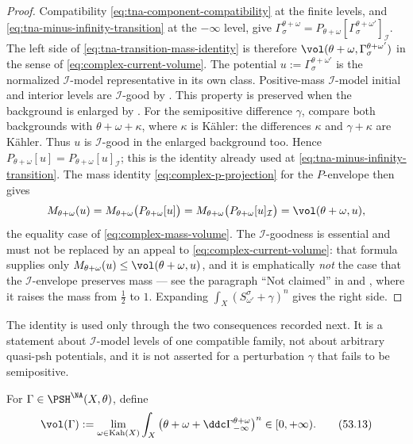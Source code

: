 \begin{proof}
Compatibility \eqref{eq:tna-component-compatibility} at the finite levels,
and \eqref{eq:tna-minus-infinity-transition} at the $-\infty$ level, give
$\Gamma_\sigma^{\theta+\omega}
   =P_{\theta+\omega}[\Gamma_\sigma^{\theta+\omega'}]_{\mathcal I}$.
The left side of \eqref{eq:tna-transition-mass-identity} is therefore
$\vol(\theta+\omega,\Gamma_\sigma^{\theta+\omega'})$ in the sense of
\eqref{eq:complex-current-volume}.  The potential $u:=\Gamma_\sigma^{\theta+\omega'}$ is the normalized
$\mathcal I$-model representative in its own class. Positive-mass
$\mathcal I$-model initial and interior levels are $\mathcal I$-good by
\cite[Example~7.1.2 and Theorem~7.1.1]{XiaBook}.
This property is preserved when the background is enlarged by
\cite[Lemma~7.1.1]{XiaBook}. For the semipositive difference $\gamma$,
compare both backgrounds with $\theta+\omega+\kappa$, where $\kappa$ is
K\"ahler: the differences $\kappa$ and $\gamma+\kappa$ are K\"ahler.
Thus $u$ is $\mathcal I$-good in the enlarged background too. Hence
$P_{\theta+\omega}[u]=P_{\theta+\omega}[u]_{\mathcal I}$; this is the
identity already used at \eqref{eq:tna-minus-infinity-transition}.  The mass
identity \eqref{eq:complex-p-projection} for the $P$-envelope then gives
\[
 M_{\theta+\omega}(u)
 =M_{\theta+\omega}\bigl(P_{\theta+\omega}[u]\bigr)
 =M_{\theta+\omega}\bigl(P_{\theta+\omega}[u]_{\mathcal I}\bigr)
 =\vol(\theta+\omega,u),
\]
the equality case of \eqref{eq:complex-mass-volume}.  The
$\mathcal I$-goodness is essential and must not be replaced by an appeal to
\eqref{eq:complex-current-volume}: that formula supplies only
$M_{\theta+\omega}(u)\leq\vol(\theta+\omega,u)$, and it is emphatically
\emph{not} the case that the $\mathcal I$-envelope preserves mass --- see
the paragraph ``Not claimed'' in  and
, where it raises the mass from $\tfrac12$ to $1$.
Expanding $\int_X(S^\sigma_{\omega'}+\gamma)^n$ gives the right side.
\end{proof}

The identity is used only through the two consequences recorded next.  It is
a statement about $\mathcal I$-model levels of one compatible family, not
about arbitrary quasi-psh potentials, and it is not asserted for a
perturbation $\gamma$ that fails to be semipositive.

\begin{definition}
\label{def:tna-volume}
For $\Gamma\in\PSH^{\NA}(X,\theta)$, define
\[
 \vol(\Gamma)
 :=\lim_{\omega\in\operatorname{Kah}(X)}
 \int_X
 \left(\theta+\omega+
       \ddc\Gamma_{-\infty}^{\theta+\omega}\right)^n
 \in[0,+\infty).
\tag{53.13}\label{eq:tna-volume}
\]
\end{definition}

